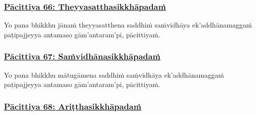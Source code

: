 \subsubsection*{\hyperref[exp66]{Pācittiya 66: Theyyasatthasikkhāpadaṁ}}
\label{pac66}

Yo pana bhikkhu jānaṁ theyyasatthena saddhiṁ saṁvidhāya ek'addhānamaggaṁ paṭipajjeyya antamaso gām'antaram'pi, pācittiyaṁ.



\subsubsection*{\hyperref[exp67]{Pācittiya 67: Saṁvidhānasikkhāpadaṁ}}
\label{pac67}

Yo pana bhikkhu mātugāmena saddhiṁ saṁvidhāya ek'addhānamaggaṁ paṭipajjeyya antamaso gām'antaram'pi, pācittiyaṁ.



\subsubsection*{\hyperref[exp68]{Pācittiya 68: Ariṭṭhasikkhāpadaṁ}}
\label{pac68}

